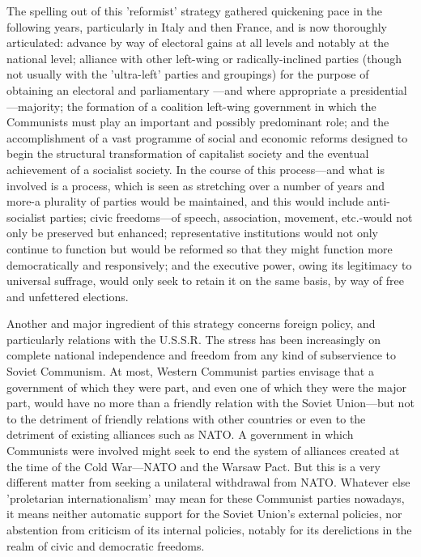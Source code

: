 The spelling out of this 'reformist' strategy gathered quickening pace in the following years, particularly in Italy and then France, and is now thoroughly articulated: advance by way of electoral gains at all levels and notably at the national level; alliance with other left-wing or radically-inclined parties (though not usually with the 'ultra-left' parties and groupings) for the purpose of obtaining an electoral and parliamentary —and where appropriate a presidential—majority; the formation of a coalition left-wing government in which the Communists must play an important and possibly predominant role; and the accomplishment of a vast programme of social and economic reforms designed to begin the structural transformation of capitalist society and the eventual achievement of a socialist society. In the course of this process—and what is involved is a process, which is seen as stretching over a number of years and more-a plurality of parties would be maintained, and this would include anti-socialist parties; civic freedoms—of speech, association, movement, etc.-would not only be preserved but enhanced; representative institutions would not only continue to function but would be reformed so that they might function more democratically and responsively; and the executive power, owing its legitimacy to universal suffrage, would only seek to retain it on the same basis, by way of free and unfettered elections.

Another and major ingredient of this strategy concerns foreign policy, and particularly relations with the U.S.S.R. The stress has been increasingly on complete national independence and freedom from any kind of subservience to Soviet Communism. At most, Western Communist parties envisage that a government of which they were part, and even one of which they were the major part, would have no more than a friendly relation with the Soviet Union—but not to the detriment of friendly relations with other countries or even to the detriment of existing alliances such as NATO. A government in which Communists were involved might seek to end the system of alliances created at the time of the Cold War—NATO and the Warsaw Pact. But this is a very different matter from seeking a unilateral withdrawal from NATO. Whatever else 'proletarian internationalism' may mean for these Communist parties nowadays, it means neither automatic support for the Soviet Union's external policies, nor abstention from criticism of its internal policies, notably for its derelictions in the realm of civic and democratic freedoms.


